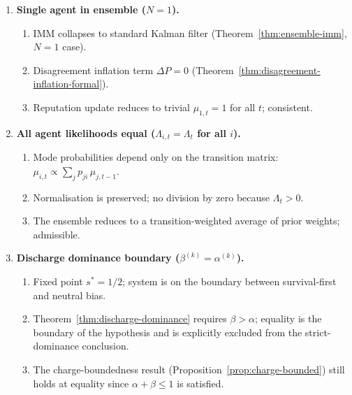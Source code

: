 \documentclass[12pt,openany]{book}
\numberwithin{equation}{chapter}
\theoremstyle{plain}
\theoremstyle{definition}
\theoremstyle{remark}
\begin{document}
\begin{enumerate}
  \item \textbf{Single agent in ensemble ($N = 1$).}
        \begin{enumerate}
          \item IMM collapses to standard Kalman filter
                (Theorem~\ref{thm:ensemble-imm}, $N=1$ case).
          \item Disagreement inflation term $\Delta P = 0$
                (Theorem~\ref{thm:disagreement-inflation-formal}).
          \item Reputation update reduces to trivial
                $\mu_{1,t} = 1$ for all $t$; consistent.
        \end{enumerate}

  \item \textbf{All agent likelihoods equal
        ($\Lambda_{i,t} = \Lambda_t$ for all $i$).}
        \begin{enumerate}
          \item Mode probabilities depend only on the
                transition matrix: $\mu_{i,t} \propto
                \sum_j p_{ji}\,\mu_{j,t-1}$.
          \item Normalisation is preserved; no division
                by zero because $\Lambda_t > 0$.
          \item The ensemble reduces to a transition-weighted
                average of prior weights; admissible.
        \end{enumerate}

  \item \textbf{Discharge dominance boundary
        ($\beta^{(k)} = \alpha^{(k)}$).}
        \begin{enumerate}
          \item Fixed point $s^* = 1/2$; system is on the
                boundary between survival-first and neutral
                bias.
          \item Theorem~\ref{thm:discharge-dominance} requires
                $\beta > \alpha$; equality is the boundary of
                the hypothesis and is explicitly excluded from
                the strict-dominance conclusion.
          \item The charge-boundedness result
                (Proposition~\ref{prop:charge-bounded}) still
                holds at equality since $\alpha + \beta \le 1$
                is satisfied.
        \end{enumerate}

\end{enumerate}
\end{document}
